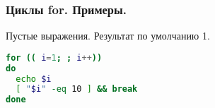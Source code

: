 \begin{frame}[fragile]
\frametitle{ Циклы for. Примеры.}
  \begin{block}{Пустые выражения. Результат по умолчанию 1. }
    \begin{lstlisting}[language=sh,frame=single]
for (( i=1; ; i++))
do
  echo $i 
  [ "$i" -eq 10 ] && break 
done
    \end{lstlisting}
  \end{block}
\end{frame}
